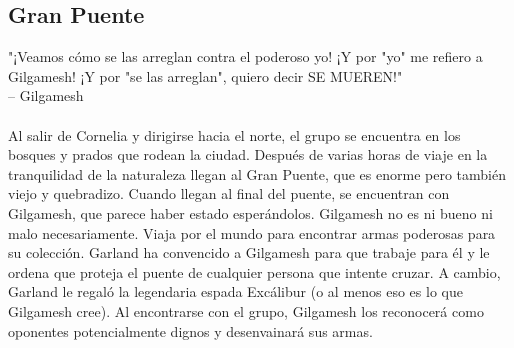 \subsection*{Gran Puente}
"¡Veamos cómo se las arreglan contra el poderoso yo! ¡Y por "yo" me refiero a Gilgamesh! ¡Y por "se las arreglan", quiero decir SE MUEREN!" \\
\indent -- Gilgamesh \\\\
\noindent
Al salir de Cornelia y dirigirse hacia el norte, el grupo se encuentra en los bosques y prados que rodean la ciudad. Después de varias horas de viaje en la tranquilidad de la naturaleza llegan al Gran Puente, que es enorme pero también viejo y quebradizo. Cuando llegan al final del puente, se encuentran con Gilgamesh, que parece haber estado esperándolos. Gilgamesh no es ni bueno ni malo necesariamente. Viaja por el mundo para encontrar armas poderosas para su colección. Garland ha convencido a Gilgamesh para que trabaje para él y le ordena que proteja el puente de cualquier persona que intente cruzar. A cambio, Garland le regaló la legendaria espada Excálibur (o al menos eso es lo que Gilgamesh cree). Al encontrarse con el grupo, Gilgamesh los reconocerá como oponentes potencialmente dignos y desenvainará sus armas.
\pagebreak



